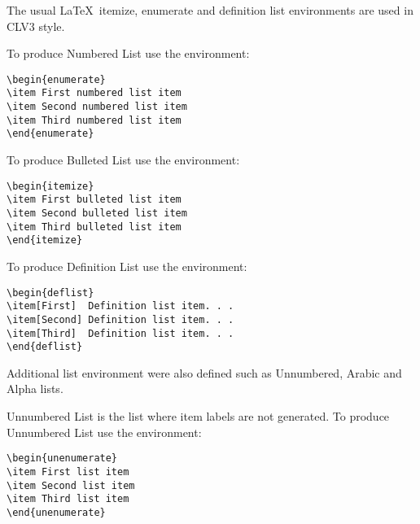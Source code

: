 \documentclass{clv3}
\begin{document}
The usual \LaTeX\ itemize, enumerate and definition list environments are used 
in CLV3 style. 

To produce Numbered List use the environment:

\begin{verbatim}
\begin{enumerate}
\item First numbered list item
\item Second numbered list item
\item Third numbered list item
\end{enumerate}
\end{verbatim}

To produce Bulleted List use the environment:

\begin{verbatim}
\begin{itemize}
\item First bulleted list item
\item Second bulleted list item
\item Third bulleted list item
\end{itemize}
\end{verbatim}

To produce Definition List use the environment:

\begin{verbatim}
\begin{deflist}
\item[First]  Definition list item. . .
\item[Second] Definition list item. . .
\item[Third]  Definition list item. . .
\end{deflist}
\end{verbatim}

Additional list environment were also defined such as Unnumbered, Arabic and Alpha lists.

Unnumbered List is the list where item labels are not generated. To produce Unnumbered List use the environment:

\begin{verbatim}
\begin{unenumerate}
\item First list item
\item Second list item
\item Third list item
\end{unenumerate}
\end{verbatim}
\end{document}
